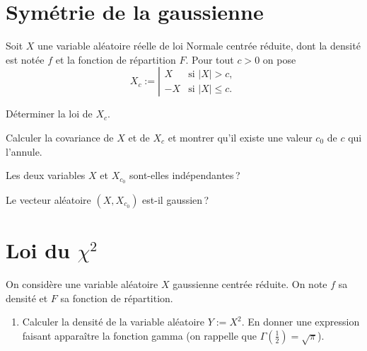 \section{Symétrie de la
gaussienne}\label{II-symuxe9trie-de-la-gaussienne}

Soit \(X\) une variable aléatoire réelle de loi Normale centrée réduite,
dont la densité est notée \(f\) et la fonction de répartition \(F\).
Pour tout \(c>0\) on pose
\[X_c := \left|\begin{array}{ll} X & \text{si } |X| > c,\\ -X & \text{si } |X| \leq c.\end{array}\right.\]

\label{II-gausssym-loi}
Déterminer la loi de \(X_c\).

\label{II-gausssym-cov}
Calculer la covariance de \(X\) et de \(X_c\) et montrer qu'il existe
une valeur \(c_0\) de \(c\) qui l'annule.

\label{II-gausssym-indep}
Les deux variables \(X\) et \(X_{c_0}\) sont-elles
indépendantes\,?

\label{II-gausssym-vecgauss}
Le vecteur aléatoire \((X,X_{c_0})\) est-il
gaussien\,?

\section{Loi du \(\chi^2\)}\label{II-loi-du-chi2}

On considère une variable aléatoire \(X\) gaussienne centrée réduite. On
note \(f\) sa densité et \(F\) sa fonction de répartition.

\label{II-khi2-1dl}

\begin{enumerate}
\def\labelenumi{\arabic{enumi}.}
\tightlist
\item
  Calculer la densité de la variable aléatoire \(Y := X^2\). En donner
  une expression faisant apparaître la fonction gamma (on rappelle que
  \(\Gamma\left(\frac{1}{2}\right)=\sqrt{\pi}\)).
\end{enumerate}

